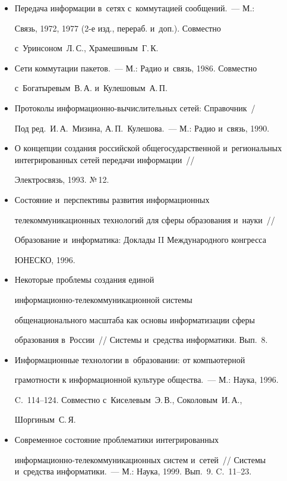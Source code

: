      \begin{itemize}


\item Передача информации в~сетях с~коммутацией сообщений.~--- М.:


Связь, 1972, 1977 (2-е изд., перераб. и~доп.). Совместно


с~Уринсоном~Л.\,С., Храмешиным~Г.\,К.


\item Сети коммутации пакетов.~--- М.: Радио и~связь, 1986. Совместно


с~Богатыревым~В.\,А. и~Кулешовым~А.\,П.


\item Протоколы информационно-вычислительных сетей: Справочник~/


Под ред.\ И.\,А.~Мизина, А.\,П.~Кулешова.~--- М.: Радио и~связь, 1990.


\item О концепции создания российской общегосударственной и~региональных интегрированных сетей передачи информации~/\!\!/


Электросвязь, 1993. №\,12.


\item Состояние и~перспективы развития информационных


телекоммуникационных технологий для сферы образования и~науки~/\!\!/


Образование и~информатика: Доклады II Международного конгресса


ЮНЕСКО, 1996.


\item Некоторые проблемы создания единой


инфор\-ма\-ци\-он\-но-те\-ле\-ком\-му\-ни\-ка\-ци\-он\-ной системы


общенационального масштаба как основы информатизации сферы


образования в~России~/\!\!/ Системы и~средства информатики. Вып.~8.


\item Информационные технологии в~образовании: от компьютерной


грамотности к информационной культуре общества.~--- М.: Наука, 1996.


C.~114--124. Совместно с~Киселевым~Э.\,В., Соколовым~И.\,А.,


Шоргиным~С.\,Я.


\item Современное состояние проблематики интегрированных


информационно-те\-ле\-ком\-му\-ни\-ка\-ци\-он\-ных систем и~сетей~/\!\!/ Системы и~средства информатики.~--- М.: Наука, 1999. Вып.~9. C.~11--23.


     \end{itemize}





